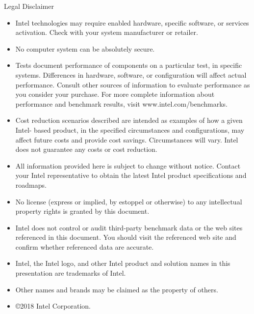 \documentclass[aspectratio=169, xcolor=table]{beamer}
\begin{document}
  \begin{frame}{Legal Disclaimer}
  \tiny
  \begin{itemize}
  \item Intel technologies may require enabled hardware, specific software, or services activation. Check with your system manufacturer or retailer.
  \item No computer system can be absolutely secure.
  \item Tests document performance of components on a particular test, in specific systems. Differences in hardware, software, or configuration will affect actual performance. Consult other sources of information to evaluate performance as you consider your purchase. For more complete information about performance and benchmark results, visit www.intel.com/benchmarks.
  \item Cost reduction scenarios described are intended as examples of how a given Intel- based product, in the specified circumstances and configurations, may affect future costs and provide cost savings. Circumstances will vary. Intel does not guarantee any costs or cost reduction.
  \item All information provided here is subject to change without notice. Contact your Intel representative to obtain the latest Intel product specifications and roadmaps.
  \item No license (express or implied, by estoppel or otherwise) to any intellectual property rights is granted by this document.
  \item Intel does not control or audit third-party benchmark data or the web sites referenced in this document. You should visit the referenced web site and confirm whether referenced data are accurate.
  \item Intel, the Intel logo, and other Intel product and solution names in this presentation are trademarks of Intel.
  \item Other names and brands may be claimed as the property of others.
  \item \copyright 2018 Intel Corporation.
  \end{itemize}
  \end{frame}
\end{document}
